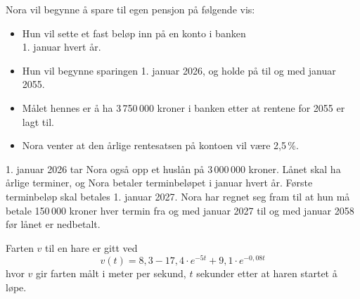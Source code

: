 Nora vil begynne å spare til egen pensjon på følgende vis:
\begin{itemize}
	\item Hun vil sette et fast beløp inn på en konto i banken\\ 1. januar hvert år. 
	\item Hun vil begynne sparingen 1. januar 2026, og holde på til og med januar 2055.
	\item Målet hennes er å ha 3\,750\,000 kroner i banken etter at rentene for 2055 er lagt til. 
	\item Nora venter at den årlige rentesatsen på kontoen vil være 2,5\,\%.
\end{itemize}
1. januar 2026 tar Nora også opp et huslån på 3\,000\,000 kroner. Lånet skal ha årlige terminer, og Nora betaler terminbeløpet i januar hvert år. Første terminbeløp skal betales 1. januar 2027.
Nora har regnet seg fram til at hun må betale 150\,000 kroner hver termin fra og med januar 2027 til og med januar 2058 før lånet er nedbetalt.

Farten $v$ til en hare er gitt ved	
\[ v(t) = 8,3 - 17,4 \cdot e^{-5t} + 9,1 \cdot e^{-0,08t} \]
hvor $v$ gir farten målt i meter per sekund, $t$ sekunder etter at haren startet å løpe.


